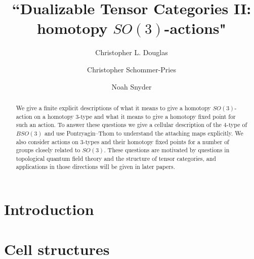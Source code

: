 \documentclass{amsart}
\begin{document}
\title{``Dualizable Tensor Categories II: homotopy $SO(3)$-actions"}

\author{Christopher L. Douglas}
\address{Mathematical Institute\\ University of Oxford\\ Oxford OX1 3LB\\ United Kingdom}
      	
\author{Christopher Schommer-Pries}
\address{Department of Mathematics\\ University of Notre Dame \\ Notre Dame, IN 46556\\ USA}

\author{Noah Snyder}
\address{Department of Mathematics\\ Indiana University\\ Bloomington, IN 47405\\ USA}


\begin{abstract}
We give a finite explicit descriptions of what it means to give a homotopy $SO(3)$-action on a homotopy $3$-type and what it means to give a homotopy fixed point for such an action.  To answer these questions we give a cellular description of the $4$-type of $BSO(3)$ and use Pontryagin--Thom to understand the attaching maps explicitly.  We also consider actions on $3$-types and their homotopy fixed points for a number of groups closely related to $SO(3)$.  These questions are motivated by questions in topological quantum field theory and the structure of tensor categories, and applications in those directions will be given in later papers.
\end{abstract}

\maketitle

\tikzexternaldisable

\tableofcontents

\section{Introduction}



\section{Cell structures}
\end{document}
